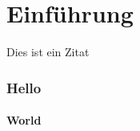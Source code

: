 \chapter{Einführung}

\epigraph{Dies ist ein Zitat}{\thesisAuthor}

\Blindtext[2]



\Blindtext[2]



\Blindtext[2]

\subsection{Hello}

\Blindtext[2]

\subsubsection{World}

\Blindtext[2]